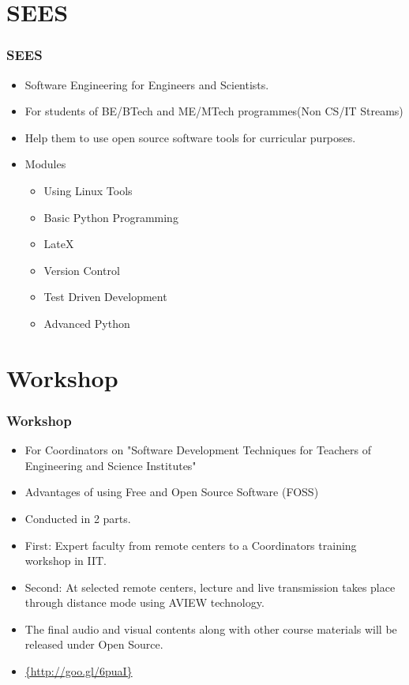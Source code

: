 \documentclass{beamer}
\begin{document}
\section{SEES}
\begin{frame}
  \frametitle{SEES}
    \begin{itemize}
    \item Software Engineering for Engineers and Scientists.
    \item For students of BE/BTech and ME/MTech programmes(Non CS/IT Streams)
   	\item Help them to use open source software tools for curricular purposes.
    \item Modules 
    \begin{itemize}
    \item Using Linux Tools
	\item Basic Python Programming
	\item LateX
	\item Version Control
	\item Test Driven Development
	\item Advanced Python
    \end{itemize}
	\end{itemize}
\end{frame}

\section{Workshop}

\begin{frame}
  \frametitle{Workshop}
  \begin{itemize}
  \item For Coordinators on "Software Development Techniques for Teachers of Engineering and Science Institutes"
  \item Advantages of using Free and Open Source Software (FOSS)
  \item Conducted in 2 parts.
  \item First: Expert faculty from remote centers to a Coordinators training workshop in IIT.
  \item Second: At selected remote centers, lecture and live transmission takes place through distance mode using AVIEW technology. 
  \item The final audio and visual contents along with other course materials will be released under Open Source.
  \item \url{{http://goo.gl/6puaI}}
  \end{itemize}
\end{frame}
\end{document}
